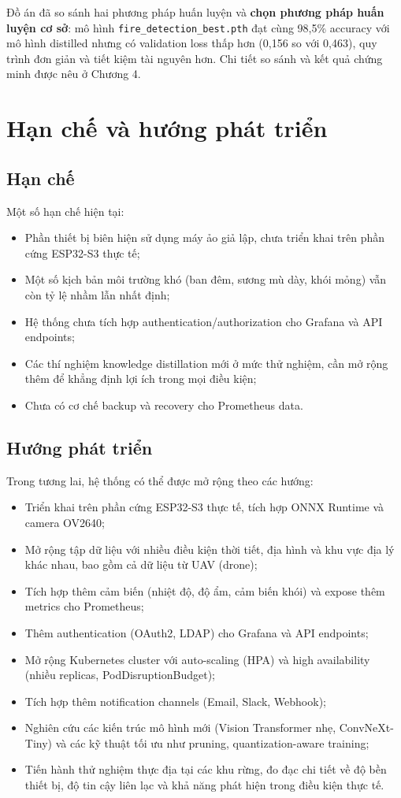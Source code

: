 \documentclass[12pt,a4paper]{report}
\begin{document}
Đồ án đã so sánh hai phương pháp huấn luyện và \textbf{chọn phương pháp huấn luyện cơ sở}: mô hình \texttt{fire\_detection\_best.pth} đạt cùng 98{,}5\% accuracy với mô hình distilled nhưng có validation loss thấp hơn (0{,}156 so với 0{,}463), quy trình đơn giản và tiết kiệm tài nguyên hơn. Chi tiết so sánh và kết quả chứng minh được nêu ở Chương 4.

\section{Hạn chế và hướng phát triển}

\subsection{Hạn chế}

Một số hạn chế hiện tại:
\begin{itemize}
  \item Phần thiết bị biên hiện sử dụng máy ảo giả lập, chưa triển khai trên phần cứng ESP32-S3 thực tế;
  \item Một số kịch bản môi trường khó (ban đêm, sương mù dày, khói mỏng) vẫn còn tỷ lệ nhầm lẫn nhất định;
  \item Hệ thống chưa tích hợp authentication/authorization cho Grafana và API endpoints;
  \item Các thí nghiệm knowledge distillation mới ở mức thử nghiệm, cần mở rộng thêm để khẳng định lợi ích trong mọi điều kiện;
  \item Chưa có cơ chế backup và recovery cho Prometheus data.
\end{itemize}

\subsection{Hướng phát triển}

Trong tương lai, hệ thống có thể được mở rộng theo các hướng:
\begin{itemize}
  \item Triển khai trên phần cứng ESP32-S3 thực tế, tích hợp ONNX Runtime và camera OV2640;
  \item Mở rộng tập dữ liệu với nhiều điều kiện thời tiết, địa hình và khu vực địa lý khác nhau, bao gồm cả dữ liệu từ UAV (drone);
  \item Tích hợp thêm cảm biến (nhiệt độ, độ ẩm, cảm biến khói) và expose thêm metrics cho Prometheus;
  \item Thêm authentication (OAuth2, LDAP) cho Grafana và API endpoints;
  \item Mở rộng Kubernetes cluster với auto-scaling (HPA) và high availability (nhiều replicas, PodDisruptionBudget);
  \item Tích hợp thêm notification channels (Email, Slack, Webhook);
  \item Nghiên cứu các kiến trúc mô hình mới (Vision Transformer nhẹ, ConvNeXt-Tiny) và các kỹ thuật tối ưu như pruning, quantization-aware training;
  \item Tiến hành thử nghiệm thực địa tại các khu rừng, đo đạc chi tiết về độ bền thiết bị, độ tin cậy liên lạc và khả năng phát hiện trong điều kiện thực tế.
\end{itemize}
\end{document}
